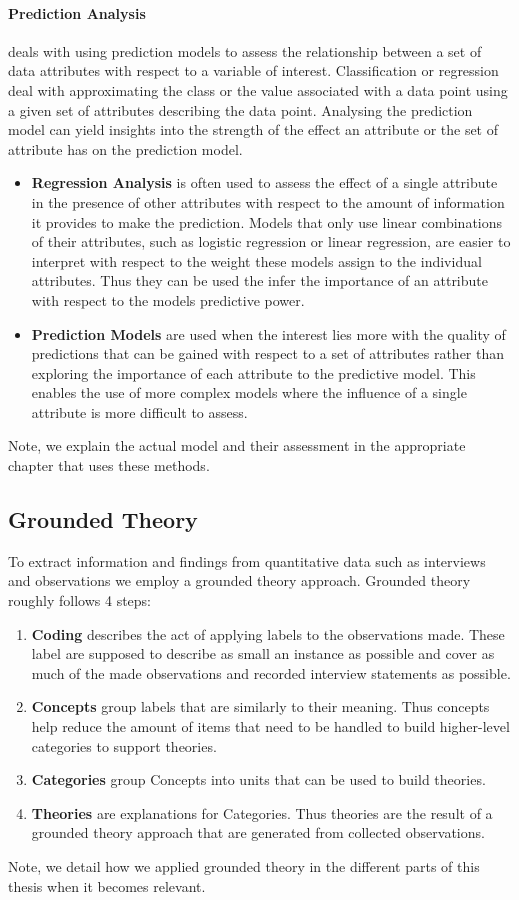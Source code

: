 \paragraph{Prediction Analysis} deals with using prediction models to assess the relationship between a set of data attributes with respect to a variable of interest.
Classification or regression deal with approximating the class or the value associated with a data point using a given set of attributes describing the data point.
Analysing the prediction model can yield insights into the strength of the effect an attribute or the set of attribute has on the prediction model.
\begin{itemize}
\item\textbf{Regression Analysis} is often used to assess the effect of a single attribute in the presence of other attributes with respect to the amount of information it provides to make the prediction.
Models that only use linear combinations of their attributes, such as logistic regression or linear regression, are easier to interpret with respect to the weight these models assign to the individual attributes.
Thus they can be used the infer the importance of an attribute with respect to the models predictive power.
\item\textbf{Prediction Models} are used when the interest lies more with the quality of predictions that can be gained with respect to a set of attributes rather than exploring the importance of each attribute to the predictive model.
This enables the use of more complex models where the influence of a single attribute is more difficult to assess.
\end{itemize}
Note, we explain the actual model and their assessment in the appropriate chapter that uses these methods.


\subsection{Grounded Theory}
To extract information and findings from quantitative data such as interviews and observations we employ a grounded theory approach.
Grounded theory roughly follows 4 steps:
 
\begin{enumerate}
\item\textbf{Coding} describes the act of applying labels to the observations made.
These label are supposed to describe as small an instance as possible and cover as much of the made observations and recorded interview statements as possible.
\item\textbf{Concepts} group labels that are similarly to their meaning.
Thus concepts help reduce the amount of items that need to be handled to build higher-level categories to support theories.
\item\textbf{Categories} group Concepts into units that can be used to build theories.
\item\textbf{Theories} are explanations for Categories.
Thus theories are the result of a grounded theory approach that are generated from collected observations.
\end{enumerate}

Note, we detail how we applied grounded theory in the different parts of this thesis when it becomes relevant.










